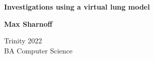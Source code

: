 \documentclass[12pt]{article}
\begin{document}

\begin{titlepage}
\begin{center}
    \Huge
    \textbf{Investigations using a virtual lung model}
    
    \vspace{1.5cm}
    \textbf{Max Sharnoff}
    
    Trinity 2022 \\
    BA Computer Science
\end{center}
\end{titlepage}

\newpage\ \addtocounter{page}{-1} \thispagestyle{empty}

\newpage


\newpage
\tableofcontents

\newpage


\newpage


\newpage


\newpage


\newpage


\newpage
{}


\newpage

\begin{appendices}

\end{appendices}
\end{document}
